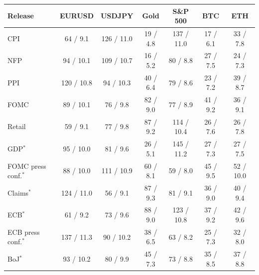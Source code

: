 \begin{tabular}{lcccccc}
\toprule
Release & EURUSD & USDJPY & Gold & S\&P 500 & BTC & ETH \\
\midrule
CPI & 64 / 9.1 & 126 / 11.0 & 19 / 4.8 & 137 / 11.0 & 17 / 6.1 & 33 / 7.8 \\
NFP & 94 / 10.1 & 109 / 10.7 & 16 / 5.2 & 80 / 8.8 & 27 / 7.5 & 24 / 7.3 \\
PPI & 120 / 10.8 & 94 / 10.3 & 40 / 6.4 & 79 / 8.6 & 23 / 7.2 & 39 / 8.7 \\
FOMC & 89 / 10.1 & 76 / 9.8 & 82 / 9.0 & 77 / 8.9 & 41 / 9.2 & 36 / 9.1 \\
Retail & 59 / 9.1 & 77 / 9.8 & 87 / 9.2 & 114 / 10.4 & 26 / 7.6 & 26 / 7.8 \\
\midrule
GDP$^\ast$ & 95 / 10.0 & 81 / 9.6 & 26 / 5.1 & 145 / 11.2 & 27 / 7.3 & 27 / 7.5 \\
FOMC press conf.$^\ast$ & 88 / 10.0 & 111 / 10.9 & 60 / 8.1 & 59 / 8.0 & 45 / 9.5 & 52 / 10.0 \\
Claims$^\ast$ & 124 / 11.0 & 56 / 9.1 & 87 / 9.3 & 81 / 9.1 & 36 / 9.0 & 40 / 9.4 \\
ECB$^\ast$ & 61 / 9.2 & 73 / 9.6 & 88 / 9.0 & 123 / 10.8 & 37 / 9.2 & 42 / 9.6 \\
ECB press conf.$^\ast$ & 137 / 11.3 & 90 / 10.2 & 38 / 6.5 & 63 / 8.2 & 25 / 7.3 & 32 / 8.0 \\
BoJ$^\ast$ & 93 / 10.2 & 80 / 9.9 & 45 / 7.3 & 73 / 8.8 & 35 / 8.5 & 37 / 8.8 \\
\bottomrule
\end{tabular}